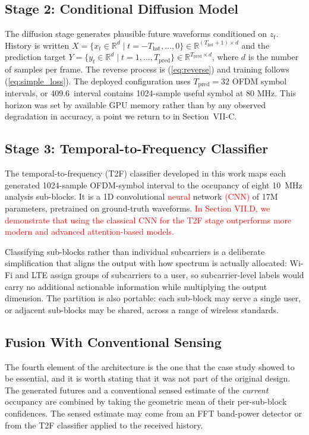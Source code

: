 \documentclass[lettersize,journal]{IEEEtran}
\newcommand{\red}[1]{\textcolor{red}{#1}}
\begin{document}
\subsection{\textbf{Stage 2: Conditional Diffusion Model}}
The diffusion stage generates plausible future waveforms conditioned on
$z_t$. History is written
$X = \{x_t \in \mathbb{R}^d \mid t = -T_{\mathrm{hst}}, \ldots, 0\}
\in \mathbb{R}^{(T_{\mathrm{hst}}+1)\times d}$
and the prediction target
$Y = \{y_t \in \mathbb{R}^d \mid t = 1, \ldots, T_{\mathrm{pred}}\}
\in \mathbb{R}^{T_{\mathrm{pred}}\times d}$,
where $d$ is the number of samples per frame. The reverse process is
(\ref{eq:reverse}) and training follows (\ref{eq:simple_loss}). The
deployed configuration uses $T_{\mathrm{pred}} = 32$ OFDM symbol intervals, or
 409.6~\uswheneach interval contains 1024-sample useful symbol at 80 MHz.
This horizon was set by available GPU memory
rather than by any observed degradation in accuracy, a point we return
to in Section~VII-C.

\subsection{\textbf{Stage 3: Temporal-to-Frequency Classifier}}
The temporal-to-frequency (T2F) classifier 
developed in this work maps each generated 1024-sample
OFDM-symbol interval
to the occupancy of eight 10~MHz analysis sub-blocks. It is a 1D
convolutional \red{neural} network \red{(CNN)} of 17M parameters, pretrained on ground-truth
waveforms. \red{In Section VII.D, we demonstrate that using the classical CNN for the T2F stage outperforms more modern and advanced attention-based models.}

Classifying sub-blocks rather than individual subcarriers is a
deliberate simplification that aligns the output with how spectrum is
actually allocated: Wi-Fi and LTE assign groups of subcarriers to a
user, so subcarrier-level labels would carry no additional actionable
information while multiplying the output dimension. The partition is also
portable: each sub-block may serve a single user, or adjacent sub-blocks may be
shared, across a range of wireless standards.

\subsection{\textbf{Fusion With Conventional Sensing}}
The fourth element of the architecture is the one that the case study
showed to be essential, and it is worth stating that it was not part of
the original design. The generated futures and a conventional sensed
estimate of the \emph{current} occupancy are combined by taking the
geometric mean of their per-sub-block confidences. The sensed estimate
may come from an FFT band-power detector or from the T2F classifier
applied to the received history.
\end{document}
